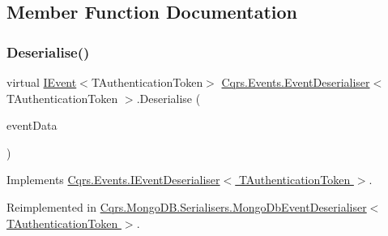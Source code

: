 \subsection{Member Function Documentation}
\mbox{\label{classCqrs_1_1Events_1_1EventDeserialiser_a193feac1d58446f0a7447d8ba04179fc_a193feac1d58446f0a7447d8ba04179fc}} 
\subsubsection{\texorpdfstring{Deserialise()}{Deserialise()}}
{\footnotesize\ttfamily virtual \hyperlink{interfaceCqrs_1_1Events_1_1IEvent}{I\+Event}$<$T\+Authentication\+Token$>$ \hyperlink{classCqrs_1_1Events_1_1EventDeserialiser}{Cqrs.\+Events.\+Event\+Deserialiser}$<$ T\+Authentication\+Token $>$.Deserialise (\begin{DoxyParamCaption}\item[{\hyperlink{classCqrs_1_1Events_1_1EventData}{Event\+Data}}]{event\+Data }\end{DoxyParamCaption})\hspace{0.3cm}{\ttfamily [virtual]}}



Implements \hyperlink{interfaceCqrs_1_1Events_1_1IEventDeserialiser_af9216046631ed941bb96b58a0cc27f22_af9216046631ed941bb96b58a0cc27f22}{Cqrs.\+Events.\+I\+Event\+Deserialiser$<$ T\+Authentication\+Token $>$}.



Reimplemented in \hyperlink{classCqrs_1_1MongoDB_1_1Serialisers_1_1MongoDbEventDeserialiser_a2ea63367d97bf66e3dffcabb8c53005e_a2ea63367d97bf66e3dffcabb8c53005e}{Cqrs.\+Mongo\+D\+B.\+Serialisers.\+Mongo\+Db\+Event\+Deserialiser$<$ T\+Authentication\+Token $>$}.

\mbox{\label{classCqrs_1_1Events_1_1EventDeserialiser_a3f767a1b793ea47bcafd9c64be47619e_a3f767a1b793ea47bcafd9c64be47619e}} 
